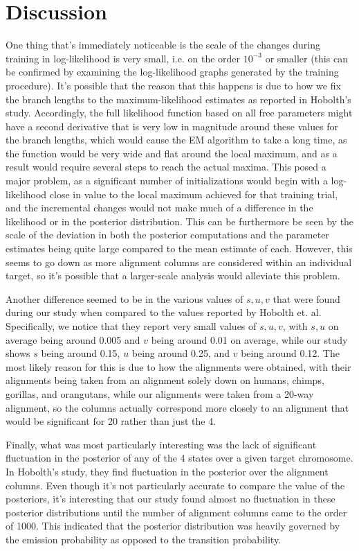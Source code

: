 \documentclass[12pt]{article}
\begin{document}
    \section{Discussion}
    One thing that's immediately noticeable is the scale of the changes during training in log-likelihood is very small, i.e. on the order $10^{-3}$ or smaller (this can be confirmed by examining the log-likelihood graphs generated by the training procedure). It's possible that the reason that this happens is due to how we fix the branch lengths to the maximum-likelihood estimates as reported in Hobolth's study. Accordingly, the full likelihood function based on all free parameters might have a second derivative that is very low in magnitude around these values for the branch lengths, which would cause the EM algorithm to take a long time, as the function would be very wide and flat around the local maximum, and as a result would require several steps to reach the actual maxima. This posed a major problem, as a significant number of initializations would begin with a log-likelihood close in value to the local maximum achieved for that training trial, and the incremental changes would not make much of a difference in the likelihood or in the posterior distribution. This can be furthermore be seen by the scale of the deviation in both the posterior computations and the parameter estimates being quite large compared to the mean estimate of each. However, this seems to go down as more alignment columns are considered within an individual target, so it's possible that a larger-scale analysis would alleviate this problem.

    Another difference seemed to be in the various values of $s, u, v$ that were found during our study when compared to the values reported by Hobolth et. al. Specifically, we notice that they report very small values of $s, u, v$, with $s, u$ on average being around 0.005 and $v$ being around 0.01 on average, while our study shows $s$ being around 0.15, $u$ being around 0.25, and $v$ being around 0.12. The most likely reason for this is due to how the alignments were obtained, with their alignments being taken from an alignment solely down on humans, chimps, gorillas, and orangutans, while our alignments were taken from a 20-way alignment, so the columns actually correspond more closely to an alignment that would be significant for 20 rather than just the 4.

    Finally, what was most particularly interesting was the lack of significant fluctuation in the posterior of any of the 4 states over a given target chromosome. In Hobolth's study, they find fluctuation in the posterior over the alignment columns. Even though it's not particularly accurate to compare the value of the posteriors, it's interesting that our study found almost no fluctuation in these posterior distributions until the number of alignment columns came to the order of 1000. This indicated that the posterior distribution was heavily governed by the emission probability as opposed to the transition probability.
\end{document}
